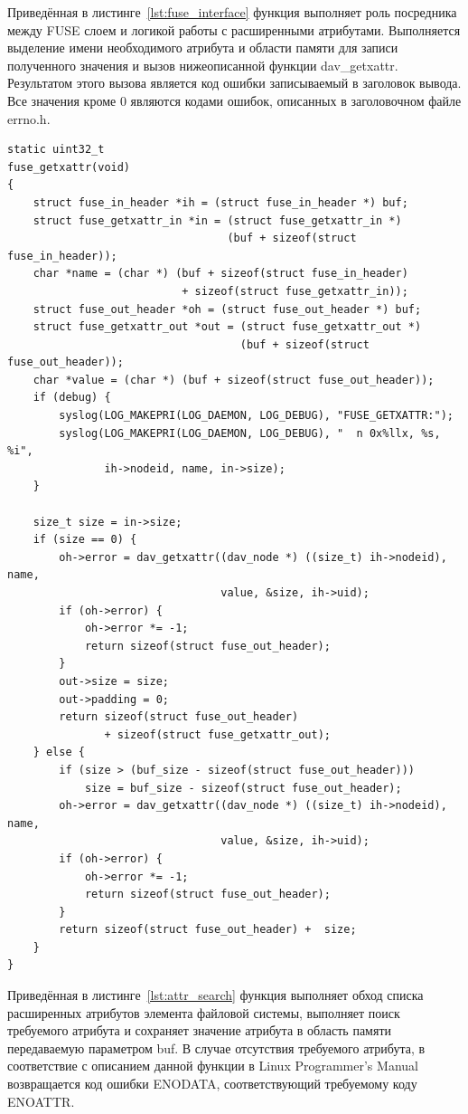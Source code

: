\documentclass[utf8,usehyperref,12pt]{G7-32}
\begin{document}
Приведённая в листинге~\ref{lst:fuse_interface} функция выполняет роль посредника между FUSE слоем и логикой работы с расширенными атрибутами. Выполняется выделение имени необходимого атрибута и области памяти для записи полученного значения и вызов нижеописанной функции dav\_getxattr. Результатом этого вызова является код ошибки записываемый в заголовок вывода. Все значения кроме 0 являются кодами ошибок, описанных в заголовочном файле errno.h.
\lstset{language=C,caption=Взаимодействие с FUSE,label=lst:fuse_interface}
\begin{lstlisting}
static uint32_t
fuse_getxattr(void)
{
    struct fuse_in_header *ih = (struct fuse_in_header *) buf;
    struct fuse_getxattr_in *in = (struct fuse_getxattr_in *)
                                  (buf + sizeof(struct fuse_in_header));
    char *name = (char *) (buf + sizeof(struct fuse_in_header)
                           + sizeof(struct fuse_getxattr_in));
    struct fuse_out_header *oh = (struct fuse_out_header *) buf;
    struct fuse_getxattr_out *out = (struct fuse_getxattr_out *)
                                    (buf + sizeof(struct fuse_out_header));
    char *value = (char *) (buf + sizeof(struct fuse_out_header));
    if (debug) {
        syslog(LOG_MAKEPRI(LOG_DAEMON, LOG_DEBUG), "FUSE_GETXATTR:");
        syslog(LOG_MAKEPRI(LOG_DAEMON, LOG_DEBUG), "  n 0x%llx, %s, %i",
               ih->nodeid, name, in->size);
    }

    size_t size = in->size;
    if (size == 0) {
        oh->error = dav_getxattr((dav_node *) ((size_t) ih->nodeid), name,
                                 value, &size, ih->uid);
        if (oh->error) {
            oh->error *= -1;
            return sizeof(struct fuse_out_header);
        }
        out->size = size;
        out->padding = 0;
        return sizeof(struct fuse_out_header)
               + sizeof(struct fuse_getxattr_out);
    } else {
        if (size > (buf_size - sizeof(struct fuse_out_header)))
            size = buf_size - sizeof(struct fuse_out_header);
        oh->error = dav_getxattr((dav_node *) ((size_t) ih->nodeid), name,
                                 value, &size, ih->uid);
        if (oh->error) {
            oh->error *= -1;
            return sizeof(struct fuse_out_header);
        }
        return sizeof(struct fuse_out_header) +  size;
    }
}
\end{lstlisting}

Приведённая в листинге~\ref{lst:attr_search} функция выполняет обход списка расширенных атрибутов элемента файловой системы, выполняет поиск требуемого атрибута и сохраняет значение атрибута в область памяти передаваемую параметром buf. В случае отсутствия требуемого атрибута, в соответствие с описанием данной функции в Linux Programmer's Manual\cite{man_getxattr} возвращается код ошибки ENODATA, соответствующий требуемому коду ENOATTR.
\end{document}

